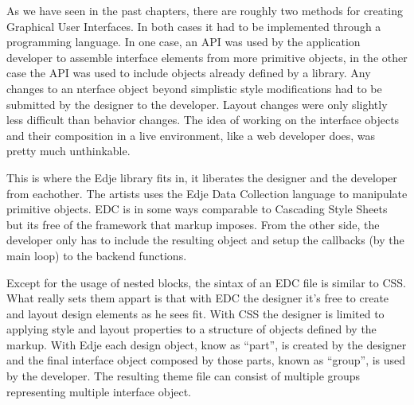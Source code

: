 \documentclass[12pt,a4paper,english]{book}
\begin{document}
As we have seen in the past chapters, there are roughly two methods for
creating Graphical User Interfaces. In both cases it had to be implemented
through a programming language. In one case, an API was used by the application
developer to assemble interface elements from more primitive objects, in the
other case the API was used to include objects already defined by a library.
Any changes to an nterface object beyond simplistic style modifications had to
be submitted by the designer to the developer. Layout changes were only
slightly less difficult than behavior changes. The idea of working on the
interface objects and their composition in a live environment, like a web
developer does, was pretty much unthinkable.

This is where the Edje library fits in, it liberates the designer and the
developer from eachother. The artists uses the Edje Data Collection language to
manipulate primitive objects. EDC is in some ways comparable to Cascading Style
Sheets but its free of the framework that markup imposes. From the other side,
the developer only has to include the resulting object and setup the callbacks
(by the main loop) to the backend functions.

{\hfill{}\hfill}

Except for the usage of nested blocks, the sintax of an EDC file is similar to
CSS. What really sets them appart is that with EDC the designer it's free to
create and layout design elements as he sees fit. With CSS the designer is
limited to applying style and layout properties to a structure of objects
defined by the markup. With Edje each design object, know as ``part'', is created
by the designer and the final interface object composed by those parts, known
as ``group'', is used by the developer. The resulting theme file can consist of
multiple groups representing multiple interface object.
\end{document}
